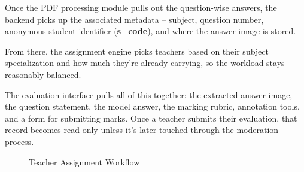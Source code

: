 Once the PDF processing module pulls out the question-wise answers, the backend picks up the associated metadata -- subject, question number, anonymous student identifier (\textbf{s\_code}), and where the answer image is stored.

From there, the assignment engine picks teachers based on their subject specialization and how much they're already carrying, so the workload stays reasonably balanced.

The evaluation interface pulls all of this together: the extracted answer image, the question statement, the model answer, the marking rubric, annotation tools, and a form for submitting marks. Once a teacher submits their evaluation, that record becomes read-only unless it's later touched through the moderation process.

\begin{figure}[H]
\centering


\caption{Teacher Assignment Workflow}
\label{fig:teacher_assignment_workflow}

\end{figure}
\FloatBarrier

